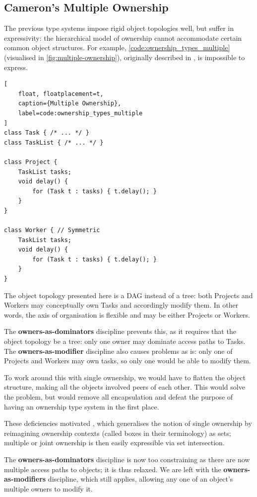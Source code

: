 \documentclass{acm_proc_article-sp}
\begin{document}
\subsection{Cameron's Multiple Ownership}
\label{subsec:cameron}

The previous type systems impose rigid object topologies well, but suffer in
expressivity: the hierarchical model of ownership cannot accommodate certain
common object structures. For example,
\cref{code:ownership_types_multiple} (visualised in
\cref{fig:multiple-ownership}), originally described in
\cite{cameron07mojo}, is impossible to express.

\begin{lstlisting}[
	float, floatplacement=t,
	caption={Multiple Ownership},
	label=code:ownership_types_multiple
]
class Task { /* ... */ }
class TaskList { /* ... */ }

class Project {
	TaskList tasks;
	void delay() {
		for (Task t : tasks) { t.delay(); }
	}
}

class Worker { // Symmetric
	TaskList tasks;
	void delay() {
		for (Task t : tasks) { t.delay(); }
	}
}
\end{lstlisting}

The object topology presented here is a DAG instead of a tree: both Projects and
Workers may conceptually own Tasks and accordingly modify them. In other words,
the axis of organisation is flexible and may be either Projects or Workers.

The \textbf{owners-as-dominators} discipline prevents this, as it requires that
the object topology be a tree: only one owner may dominate access paths to
Tasks. The \textbf{owners-as-modifier} discipline also causes problems as is:
only one of Projects and Workers may own tasks, so only one would be able to
modify them.

To work around this with single ownership, we would have to flatten the object
structure, making all the objects involved peers of each other. This would solve
the problem, but would remove all encapsulation and defeat the purpose of having
an ownership type system in the first place.

These deficiencies motivated \cite{cameron07mojo}, which generalises the notion
of single ownership by reimagining ownership contexts (called boxes in their
terminology) as sets; multiple or joint ownership is then easily expressible via
set intersection.

The \textbf{owners-as-dominators} discipline is now too constraining as there
are now multiple access paths to objects; it is thus relaxed. We are left with
the \textbf{owners-as-modifiers} discipline, which still applies, allowing any
one of an object's multiple owners to modify it.
\end{document}
